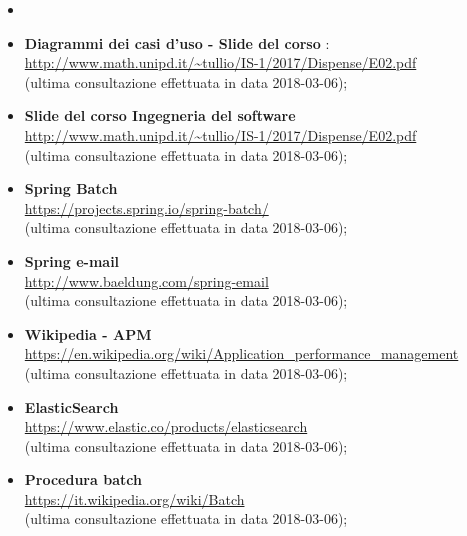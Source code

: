             \begin{itemize}
				\item \vStudioDiFattibilita \\
                    \item\textbf{Diagrammi dei casi d'uso - Slide del corso }: \\
                    \url{http://www.math.unipd.it/~tullio/IS-1/2017/Dispense/E02.pdf}\\
                    (ultima consultazione effettuata in data 2018-03-06);

                \item
                    \textbf{Slide del corso Ingegneria del software} \\
                    \url{http://www.math.unipd.it/~tullio/IS-1/2017/Dispense/E02.pdf} \\
                    (ultima consultazione effettuata in data 2018-03-06);
                    
                \item
                	\textbf{Spring Batch}\\
                	\url{https://projects.spring.io/spring-batch/}\\
                	(ultima consultazione effettuata in data 2018-03-06);
                	
               	\item
               		\textbf{Spring e-mail}\\
               		\url{http://www.baeldung.com/spring-email}\\
               		(ultima consultazione effettuata in data 2018-03-06);
               		
               	\item
               		\textbf{Wikipedia - APM}\\
               		\url{https://en.wikipedia.org/wiki/Application_performance_management} \\
               		(ultima consultazione effettuata in data 2018-03-06);
               		
               	\item
               		\textbf{ElasticSearch}\\
               		\url{https://www.elastic.co/products/elasticsearch} \\
               		(ultima consultazione effettuata in data 2018-03-06);
               		
               	\item
               		\textbf{Procedura batch}\\
               		\url{https://it.wikipedia.org/wiki/Batch} \\
               		(ultima consultazione effettuata in data 2018-03-06);
               		

\end{itemize}
